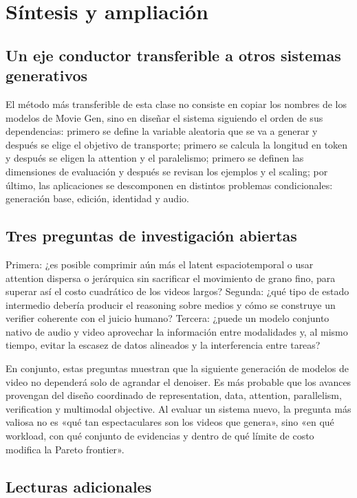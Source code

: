 \section{Síntesis y ampliación}

\subsection{Un eje conductor transferible a otros sistemas generativos}

El método más transferible de esta clase no consiste en copiar los nombres de los modelos de Movie Gen, sino en diseñar el sistema siguiendo el orden de sus dependencias: primero se define la variable aleatoria que se va a generar y después se elige el objetivo de transporte; primero se calcula la longitud en token y después se eligen la attention y el paralelismo; primero se definen las dimensiones de evaluación y después se revisan los ejemplos y el scaling; por último, las aplicaciones se descomponen en distintos problemas condicionales: generación base, edición, identidad y audio.

\subsection{Tres preguntas de investigación abiertas}

Primera: ¿es posible comprimir aún más el latent espaciotemporal o usar attention dispersa o jerárquica sin sacrificar el movimiento de grano fino, para superar así el costo cuadrático de los videos largos? Segunda: ¿qué tipo de estado intermedio debería producir el reasoning sobre medios y cómo se construye un verifier coherente con el juicio humano? Tercera: ¿puede un modelo conjunto nativo de audio y video aprovechar la información entre modalidades y, al mismo tiempo, evitar la escasez de datos alineados y la interferencia entre tareas?

En conjunto, estas preguntas muestran que la siguiente generación de modelos de video no dependerá solo de agrandar el denoiser. Es más probable que los avances provengan del diseño coordinado de representation, data, attention, parallelism, verification y multimodal objective. Al evaluar un sistema nuevo, la pregunta más valiosa no es «qué tan espectaculares son los videos que genera», sino «en qué workload, con qué conjunto de evidencias y dentro de qué límite de costo modifica la Pareto frontier».

\subsection{Lecturas adicionales}

